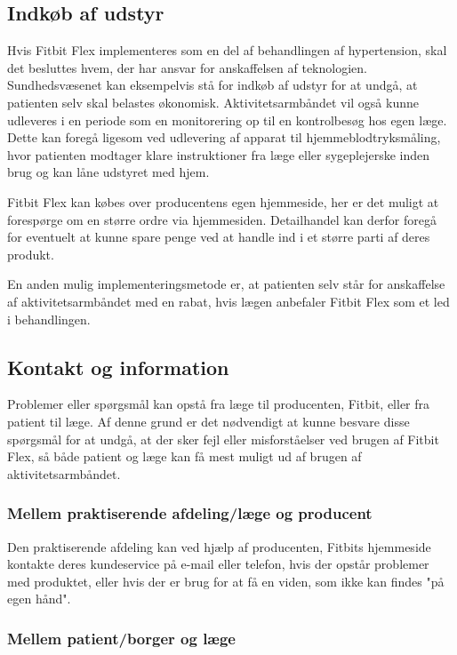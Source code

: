 \subsection{Indkøb af udstyr}	

Hvis Fitbit Flex implementeres som en del af behandlingen af hypertension, skal det besluttes hvem, der har ansvar for anskaffelsen af teknologien. Sundhedsvæsenet kan eksempelvis stå for indkøb af udstyr for at undgå, at patienten selv skal belastes økonomisk. Aktivitetsarmbåndet vil også kunne udleveres i en periode som en monitorering op til en kontrolbesøg hos egen læge. Dette kan foregå ligesom ved udlevering af apparat til hjemmeblodtryksmåling, hvor patienten modtager klare instruktioner fra læge eller sygeplejerske inden brug og kan låne udstyret med hjem.

Fitbit Flex kan købes over producentens egen hjemmeside, her er det muligt at forespørge om en større ordre via hjemmesiden. Detailhandel kan derfor foregå for eventuelt at kunne spare penge ved at handle ind i et større parti af deres produkt.

En anden mulig implementeringsmetode er, at patienten selv står for anskaffelse af aktivitetsarmbåndet med en rabat, hvis lægen anbefaler Fitbit Flex som et led i behandlingen.  

\subsection{Kontakt og information}

Problemer eller spørgsmål kan opstå fra læge til producenten, Fitbit, eller fra patient til læge. Af denne grund er det nødvendigt at kunne besvare disse spørgsmål for at undgå, at der sker fejl eller misforståelser ved brugen af Fitbit Flex, så både patient og læge kan få mest muligt ud af brugen af aktivitetsarmbåndet. 

\subsubsection{Mellem praktiserende afdeling/læge og producent}

Den praktiserende afdeling kan ved hjælp af producenten, Fitbits hjemmeside kontakte deres kundeservice på e-mail eller telefon, hvis der opstår problemer med produktet, eller hvis der er brug for at få en viden, som ikke kan findes "på egen hånd". 

\subsubsection{Mellem patient/borger og læge}

